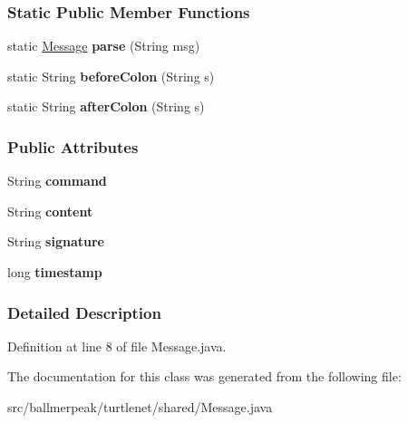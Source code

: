 \subsubsection*{Static Public Member Functions}
\begin{DoxyCompactItemize}
\item 
\hypertarget{classballmerpeak_1_1turtlenet_1_1shared_1_1Message_a6f88e1021ee9943badeeffd2ecf32262}{static \hyperlink{classballmerpeak_1_1turtlenet_1_1shared_1_1Message}{Message} {\bfseries parse} (String msg)}\label{classballmerpeak_1_1turtlenet_1_1shared_1_1Message_a6f88e1021ee9943badeeffd2ecf32262}

\item 
\hypertarget{classballmerpeak_1_1turtlenet_1_1shared_1_1Message_add3d57b933d713634ffc42d4757c18dd}{static String {\bfseries before\-Colon} (String s)}\label{classballmerpeak_1_1turtlenet_1_1shared_1_1Message_add3d57b933d713634ffc42d4757c18dd}

\item 
\hypertarget{classballmerpeak_1_1turtlenet_1_1shared_1_1Message_a51657a4b0fa0fe8080a6d9db779c2767}{static String {\bfseries after\-Colon} (String s)}\label{classballmerpeak_1_1turtlenet_1_1shared_1_1Message_a51657a4b0fa0fe8080a6d9db779c2767}

\end{DoxyCompactItemize}
\subsubsection*{Public Attributes}
\begin{DoxyCompactItemize}
\item 
\hypertarget{classballmerpeak_1_1turtlenet_1_1shared_1_1Message_a6057d3c8ba04010edfb343203176645d}{String {\bfseries command}}\label{classballmerpeak_1_1turtlenet_1_1shared_1_1Message_a6057d3c8ba04010edfb343203176645d}

\item 
\hypertarget{classballmerpeak_1_1turtlenet_1_1shared_1_1Message_a88b89de79f9fec571a22623688697de9}{String {\bfseries content}}\label{classballmerpeak_1_1turtlenet_1_1shared_1_1Message_a88b89de79f9fec571a22623688697de9}

\item 
\hypertarget{classballmerpeak_1_1turtlenet_1_1shared_1_1Message_a71a41cba8610df3d655b4b417a0361bc}{String {\bfseries signature}}\label{classballmerpeak_1_1turtlenet_1_1shared_1_1Message_a71a41cba8610df3d655b4b417a0361bc}

\item 
\hypertarget{classballmerpeak_1_1turtlenet_1_1shared_1_1Message_acc5644d2bce101cdcc576cb1b87cdf70}{long {\bfseries timestamp}}\label{classballmerpeak_1_1turtlenet_1_1shared_1_1Message_acc5644d2bce101cdcc576cb1b87cdf70}

\end{DoxyCompactItemize}


\subsubsection{Detailed Description}


Definition at line 8 of file Message.\-java.



The documentation for this class was generated from the following file\-:\begin{DoxyCompactItemize}
\item 
src/ballmerpeak/turtlenet/shared/Message.\-java\end{DoxyCompactItemize}
